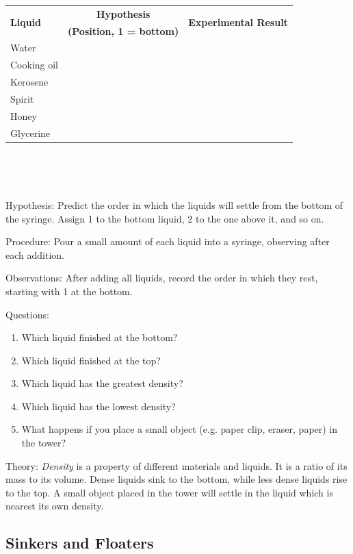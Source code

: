 \begin{description*}
{\begin{tabular}{|l|c|c|} \hline
\multirow{2}{*}{\textbf{Liquid}} & \textbf{Hypothesis} & \multirow{2}{*}{\textbf{Experimental Result}} \\
& \textbf{(Position, 1 = bottom)} & \\ \hline
Water & & \\ \hline
Cooking oil & & \\ \hline
Kerosene & & \\ \hline
Spirit & & \\ \hline
Honey & & \\ \hline
Glycerine & & \\ \hline
\end{tabular} \\[10pt]
}\\
\item[Hypothesis:]{Predict the order in which the liquids will settle from the bottom of the syringe. Assign 1 to the bottom liquid, 2 to the one above it, and so on.}
\item[Procedure:]{Pour a small amount of each liquid into a syringe, observing after each addition.}
\item[Observations:]{After adding all liquids, record the order in which they rest, starting with 1 at the bottom.}
\item[Questions:]{}\hfill
\begin{enumerate}
\item Which liquid finished at the bottom?
\item Which liquid finished at the top?
\item Which liquid has the greatest density?
\item Which liquid has the lowest density?
\item What happens if you place a small object (e.g. paper clip, eraser, paper) in the tower? 
\end{enumerate}
\item[Theory:]{\emph{Density} is a property of different materials and liquids. It is a ratio of its mass to its volume. Dense liquids sink to the bottom, while less dense liquids rise to the top. A small object placed in the tower will settle in the liquid which is nearest its own density.}
\end{description*}

\pagebreak


\subsection{Sinkers and Floaters}

